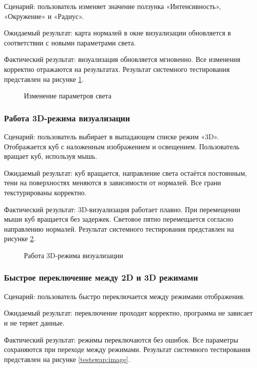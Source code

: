 Сценарий: пользователь изменяет значение ползунка «Интенсивность», «Окружение» и «Радиус».

Ожидаемый результат: карта нормалей в окне визуализации обновляется в соответствии с новыми параметрами света.

Фактический результат: визуализация обновляется мгновенно. Все изменения корректно отражаются на результатах.
\newpage
Результат системного тестирования представлен на рисунке \ref{testint:image}.

\begin{figure}[H]
	\caption{Изменение параметров света}
	\label{testint:image}
\end{figure}

\subsubsection{Работа 3D-режима визуализации}

Сценарий: пользователь выбирает в выпадающем списке режим «3D». Отображается куб с наложенным изображением и освещением. Пользователь вращает куб, используя мышь.

Ожидаемый результат: куб вращается, направление света остаётся постоянным, тени на поверхностях меняются в зависимости от нормалей. Все грани текстурированы корректно.

Фактический результат: 3D-визуализация работает плавно. При перемещении мыши куб вращается без задержек. Световое пятно перемещается согласно направлению нормалей.
\newpage
Результат системного тестирования представлен на рисунке \ref{test3d:image}.

\begin{figure}[H]
	\caption{Работа 3D-режима визуализации}
	\label{test3d:image}
\end{figure}

\subsubsection{Быстрое переключение между 2D и 3D режимами}

Сценарий: пользователь быстро переключается между режимами отображения.

Ожидаемый результат: переключение проходит корректно, программа не зависает и не теряет данные.

Фактический результат: режимы переключаются без ошибок. Все параметры сохраняются при переходе между режимами.
\newpage
Результат системного тестирования представлен на рисунке \ref{testswap:image}.

